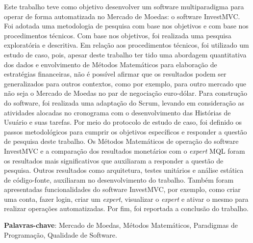 \begin{resumo}
Este trabalho teve como objetivo desenvolver um software multiparadigma para operar de forma automatizada no Mercado de Moedas: o software InvestMVC. Foi adotada uma metodologia de pesquisa com base nos objetivos e com base nos procedimentos técnicos. Com base nos objetivos, foi realizada uma pesquisa exploratória e descritiva. Em relação aos procedimentos técnicos, foi utilizado um estudo de caso, pois, apesar deste trabalho ter tido uma abordagem quantitativa dos dados e envolvimento de Métodos Matemáticos para elaboração de estratégias financeiras, não é possível afirmar que os resultados podem ser generalizados para outros contextos, como por exemplo, para outro mercado que não seja o Mercado de Moedas no par de negociação euro-dólar. Para construção do software, foi realizada uma adaptação do Scrum, levando em consideração as atividades alocadas no cronograma com o desenvolvimento das Histórias de Usuário e suas tarefas. Por meio do protocolo de estudo de caso, foi definido os passos metodológicos para cumprir os objetivos específicos e responder a questão de pesquisa deste trabalho. Os Métodos Matemáticos de operação do software InvestMVC e a comparação dos resultados monetários com o \textit{expert} MQL foram os resultados mais significativos que auxiliaram a responder a questão de pesquisa. Outros resultados como arquitetura, testes unitários e análise estática de código-fonte, auxiliaram no desenvolvimento do trabalho. Também foram apresentadas funcionalidades do software InvestMVC,  por exemplo, como criar uma conta, fazer login, criar um \textit{expert}, visualizar o \textit{expert} e ativar o mesmo para realizar operações automatizadas. Por fim, foi reportada a conclusão do trabalho.

\vspace{\onelineskip}
    
 \noindent
 \textbf{Palavras-chave}: Mercado de Moedas, Métodos Matemáticos, Paradigmas de Programação, Qualidade de Software.
\end{resumo}
